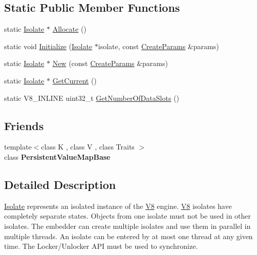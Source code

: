 \subsection*{Static Public Member Functions}
\begin{DoxyCompactItemize}
\item 
static \mbox{\hyperlink{classv8_1_1Isolate}{Isolate}} $\ast$ \mbox{\hyperlink{classv8_1_1Isolate_a6c0fccd7594c848dc388fd538106b6c7}{Allocate}} ()
\item 
static void \mbox{\hyperlink{classv8_1_1Isolate_a508901d16ef77659eb9e2b3dd476db07}{Initialize}} (\mbox{\hyperlink{classv8_1_1Isolate}{Isolate}} $\ast$isolate, const \mbox{\hyperlink{structv8_1_1Isolate_1_1CreateParams}{Create\+Params}} \&params)
\item 
static \mbox{\hyperlink{classv8_1_1Isolate}{Isolate}} $\ast$ \mbox{\hyperlink{classv8_1_1Isolate_ab6accf94a5a897fcc1220ab2c049e502}{New}} (const \mbox{\hyperlink{structv8_1_1Isolate_1_1CreateParams}{Create\+Params}} \&params)
\item 
static \mbox{\hyperlink{classv8_1_1Isolate}{Isolate}} $\ast$ \mbox{\hyperlink{classv8_1_1Isolate_aa79441b5da4438221d0f38790c4de2ed}{Get\+Current}} ()
\item 
static V8\+\_\+\+I\+N\+L\+I\+NE uint32\+\_\+t \mbox{\hyperlink{classv8_1_1Isolate_a7060092fd45588f4085753b3da1b2c82}{Get\+Number\+Of\+Data\+Slots}} ()
\end{DoxyCompactItemize}
\subsection*{Friends}
\begin{DoxyCompactItemize}
\item 
\mbox{\label{classv8_1_1Isolate_a08e2b8f164392d71811ce6cc134f33e3}} 
{\footnotesize template$<$class K , class V , class Traits $>$ }\\class {\bfseries Persistent\+Value\+Map\+Base}
\end{DoxyCompactItemize}


\subsection{Detailed Description}
\mbox{\hyperlink{classv8_1_1Isolate}{Isolate}} represents an isolated instance of the \mbox{\hyperlink{classv8_1_1V8}{V8}} engine. \mbox{\hyperlink{classv8_1_1V8}{V8}} isolates have completely separate states. Objects from one isolate must not be used in other isolates. The embedder can create multiple isolates and use them in parallel in multiple threads. An isolate can be entered by at most one thread at any given time. The Locker/\+Unlocker A\+PI must be used to synchronize. 


